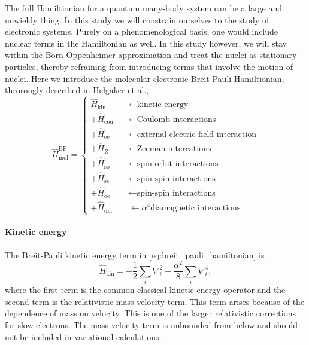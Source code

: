     The full Hamiltionian for a quantum many-body system can be a large 
    and unwieldy thing. In this study we will constrain ourselves to the study of
    electronic systems. Purely on a phenomenological basis, one would include nuclear
    terms in the Hamiltonian as well. In this study however, we will stay within the
    Born-Oppenheimer approximation and treat the nuclei as stationary particles, thereby
    refraining from introducing terms that involve the motion of nuclei. Here we
    introduce the molecular electronic Breit-Pauli Hamiltionian, throrougly described in 
    Helgaker et al.\cite{helgaker2012recent},
    \begin{equation}
        \label{eq:breit_pauli_hamiltonian}
        \hat{H}^{\text{BP}}_{\text{mol}}
        = \begin{cases}
            \hat{H}_{\text{kin}} \quad &\leftarrow \text{kinetic energy} \\
            + \hat{H}_{\text{cou}} \quad &\leftarrow \text{Coulomb interactions} \\
            + \hat{H}_{\text{ee}} \quad &\leftarrow \text{external electric field interaction} \\
            + \hat{H}_Z \quad &\leftarrow \text{Zeeman intercations} \\
            + \hat{H}_{\text{so}} &\leftarrow \text{spin-orbit interactions} \\
            + \hat{H}_{\text{ss}} &\leftarrow \text{spin-spin interactions} \\
            + \hat{H}_{\text{oo}} &\leftarrow \text{spin-spin interactions} \\
            + \hat{H}_{\text{dia}} &\leftarrow \alpha^4 \text{diamagnetic interactions}
        \end{cases}
    \end{equation}
    
    \paragraph{Kinetic energy}
    The Breit-Pauli kinetic energy term in \autoref{eq:breit_pauli_hamiltonian} is
    \begin{equation}
        \hat{H}_{\text{kin}}
            = - \frac{1}{2}\sum_i \nabla^2_i - \frac{\alpha^2}{8}\sum_{i} \nabla^4_i,
    \end{equation}
    where the first term is the common classical kinetic energy operator and the second
    term is the relativistic mass-velocity term. This term arises because of the
    dependence of mass on velocity. This is one of the larger relativistic corrections
    for slow electrons. The mass-velocity term is unbounded from below and should not
    be included in variational calculations\cite{kutzelnigg1990perturbation}.


